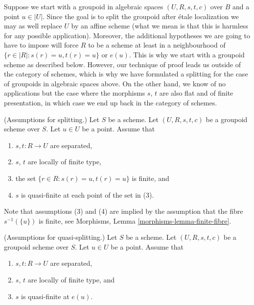 \medskip\noindent
Suppose we start with a groupoid in algebraic spaces
$(U, R, s, t, c)$ over $B$ and a point $u \in |U|$.
Since the goal is to split the groupoid after \'etale localization
we may as well replace $U$ by an affine scheme (what we mean
is that this is harmless for any possible application).
Moreover, the additional hypotheses we are going to have
to impose will force $R$ to be a scheme at least in a neighbourhood
of $\{r \in |R| : s(r) = u, t(r) = u\}$ or $e(u)$. This is why
we start with a groupoid scheme as described below.
However, our technique of proof leads us outside of the category of schemes,
which is why we have formulated a splitting for the case of groupoids
in algebraic spaces above.
On the other hand, we know of no applications but
the case where the morphisms $s$, $t$
are also flat and of finite presentation, in which case
we end up back in the category of schemes.

\begin{situation}
\label{situation-etale-localize}
(Assumptions for splitting.)
Let $S$ be a scheme.
Let $(U, R, s, t, c)$ be a groupoid scheme over $S$.
Let $u \in U$ be a point. Assume that
\begin{enumerate}
\item $s, t : R \to U$ are separated,
\item $s$, $t$ are locally of finite type,
\item the set $\{r \in R : s(r) = u, t(r) = u\}$ is finite, and
\item $s$ is quasi-finite at each point of the set in (3).
\end{enumerate}
Note that assumptions (3) and (4) are implied by the assumption
that the fibre $s^{-1}(\{u\})$ is finite, see
Morphisms, Lemma \ref{morphisms-lemma-finite-fibre}.
\end{situation}

\begin{situation}
\label{situation-etale-localize-quasi}
(Assumptions for quasi-splitting.)
Let $S$ be a scheme.
Let $(U, R, s, t, c)$ be a groupoid scheme over $S$.
Let $u \in U$ be a point. Assume that
\begin{enumerate}
\item $s, t : R \to U$ are separated,
\item $s$, $t$ are locally of finite type, and
\item $s$ is quasi-finite at $e(u)$.
\end{enumerate}
\end{situation}

